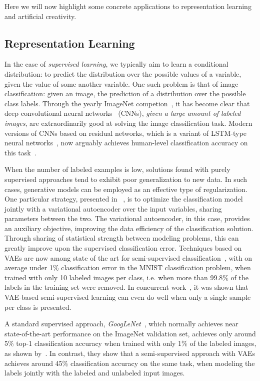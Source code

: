 \documentclass[MAL,biber]{nowfnt} %
\begin{document}
Here we will now highlight some concrete applications to representation learning and artificial creativity.

\subsection{Representation Learning}

In the case of \emph{supervised learning}, we typically aim to learn a conditional distribution: to predict the distribution over the possible values of a variable, given the value of some another variable. One such problem is that of image classification: given an image, the prediction of a distribution over the possible class labels. Through the yearly ImageNet competion~\citep{russakovsky2015imagenet}, it has become clear that deep convolutional neural networks~\citep{lecun1998gradient,goodfellow2016deeplearning} (CNNs), \emph{given a large amount of labeled images}, are extraordinarily good at solving the image classification task. Modern versions of CNNs based on residual networks, which is a variant of LSTM-type neural networks~\citep{hochreiter1997long}, now arguably achieves human-level classification accuracy on this task~\citep{he2015delving, he2015deep}.

When the number of labeled examples is low, solutions found with purely supervised approaches tend to exhibit poor generalization to new data. In such cases, generative models can be employed as an effective type of regularization. One particular strategy, presented in ~\cite{kingma2014semi}, is to optimize the classification model jointly with a variational autoencoder over the input variables, sharing parameters between the two. The variational autoencoder, in this case, provides an auxiliary objective, improving the data efficiency of the classification solution. Through sharing of statistical strength between modeling problems, this can greatly improve upon the supervised classification error. Techniques based on VAEs are now among state of the art for semi-supervised classification~\citep{maaloe2016auxiliary}, with on average under 1\% classification error in the MNIST classification problem, when trained with only 10 labeled images per class, i.e. when more than 99.8\% of the labels in the training set were removed. In concurrent work~\citep{rezende2016one}, it was shown that VAE-based semi-supervised learning can even do well when only a single sample per class is presented. 

A standard supervised approach, \emph{GoogLeNet}~\citep{szegedy2015going}, which normally achieves near state-of-the-art performance on the ImageNet validation set, achieves only around 5\% top-1 classification accuracy when trained with only 1\% of the labeled images, as shown by~\cite{pu2016variational}. In contrast, they show that a semi-supervised approach with VAEs achieves around 45\% classification accuracy on the same task, when modeling the labels jointly with the labeled and unlabeled input images.
\end{document}
